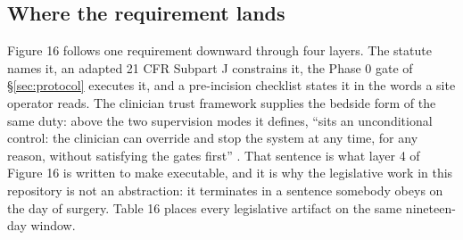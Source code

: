 \subsection{Where the requirement lands}

Figure 16 follows one requirement downward through four layers. The statute
names it, an adapted 21 CFR Subpart J constrains it, the Phase 0 gate of \S\ref{sec:protocol}
executes it, and a pre-incision checklist states it in the words a site operator
reads. The clinician trust framework supplies the bedside form of the same duty:
above the two supervision modes it defines, ``sits an unconditional control: the
clinician can override and stop the system at any time, for any reason, without
satisfying the gates first'' \cite{clintrust}. That sentence is what layer 4 of
Figure 16 is written to make executable, and it is why the legislative work in
this repository is not an abstraction: it terminates in a sentence somebody obeys
on the day of surgery. Table 16 places every legislative artifact on the same
nineteen-day window.

